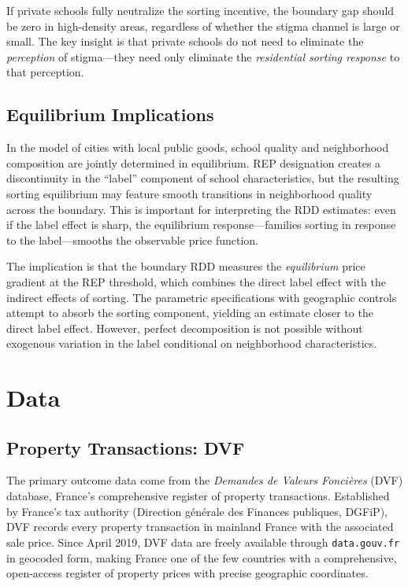 \documentclass[12pt]{article}
\begin{document}
If private schools fully neutralize the sorting incentive, the boundary gap should be zero in high-density areas, regardless of whether the stigma channel is large or small. The key insight is that private schools do not need to eliminate the \textit{perception} of stigma---they need only eliminate the \textit{residential sorting response} to that perception.

\subsection{Equilibrium Implications}

In the \citet{benabou1993} model of cities with local public goods, school quality and neighborhood composition are jointly determined in equilibrium. REP designation creates a discontinuity in the ``label'' component of school characteristics, but the resulting sorting equilibrium may feature smooth transitions in neighborhood quality across the boundary. This is important for interpreting the RDD estimates: even if the label effect is sharp, the equilibrium response---families sorting in response to the label---smooths the observable price function.

The implication is that the boundary RDD measures the \textit{equilibrium} price gradient at the REP threshold, which combines the direct label effect with the indirect effects of sorting. The parametric specifications with geographic controls attempt to absorb the sorting component, yielding an estimate closer to the direct label effect. However, perfect decomposition is not possible without exogenous variation in the label conditional on neighborhood characteristics.


\section{Data}\label{sec:data}

\subsection{Property Transactions: DVF}

The primary outcome data come from the \textit{Demandes de Valeurs Fonci\`{e}res} (DVF) database, France's comprehensive register of property transactions. Established by France's tax authority (Direction g\'{e}n\'{e}rale des Finances publiques, DGFiP), DVF records every property transaction in mainland France with the associated sale price. Since April 2019, DVF data are freely available through \texttt{data.gouv.fr} in geocoded form, making France one of the few countries with a comprehensive, open-access register of property prices with precise geographic coordinates.
\end{document}
